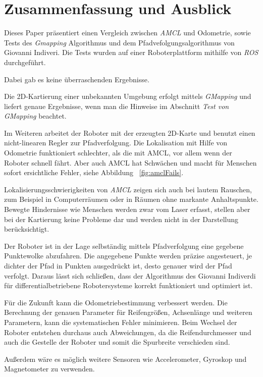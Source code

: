 \documentclass[11pt,a4paper]{article}
\begin{document}
{\section{Zusammenfassung und Ausblick}

Dieses Paper pr\"asentiert einen Vergleich zwischen \textit{AMCL} und Odometrie, sowie Tests des \textit{Gmapping} Algorithmus und dem Pfadvefolgungsalgorithmus von Giovanni Indiveri. Die Tests wurden auf einer Roboterplattform mithilfe von \textit{ROS} durchgef\"uhrt. 


Dabei gab es keine \"uberraschenden Ergebnisse.

Die 2D-Kartierung einer unbekannten Umgebung erfolgt mittels \textit{GMapping} und liefert genaue Ergebnisse, wenn man die Hinweise im Abschnitt  \textit{Test von GMapping}  beachtet.


Im Weiteren arbeitet der Roboter mit der erzeugten 2D-Karte und benutzt einen nicht-linearen Regler zur Pfadverfolgung.
Die Lokalisation mit Hilfe von Odometrie funktioniert schlechter, als die mit AMCL, vor allem wenn der Roboter schnell f\"ahrt. Aber auch AMCL hat Schw\"achen und macht f\"ur Menschen sofort ersichtliche Fehler, siehe Abbildung  ~\ref{fig:amclFails}.

Lokalisierungsschwierigkeiten von \textit{AMCL} zeigen sich auch bei lautem Rauschen, zum Beispiel in Computerr\"aumen oder in R\"aumen ohne markante Anhaltspunkte. Bewegte Hindernisse wie Menschen werden zwar vom Laser erfasst, stellen aber bei der Kartierung keine Probleme dar und werden nicht in der Darstellung ber\"ucksichtigt. 

Der Roboter ist in der Lage selbst\"andig mittels Pfadverfolgung eine gegebene Punktewolke abzufahren. Die angegebene Punkte werden pr\"azise angesteuert, je dichter der Pfad in Punkten ausgedr\"uckt ist, desto genauer wird der Pfad verfolgt. Daraus l\"asst sich schlie{\ss}en, dass der Algorithmus des Giovanni Indiverdi f\"ur differentialbetriebene Robotersysteme korrekt funktioniert und optimiert ist.

F\"ur die Zukunft kann die Odometriebestimmung verbessert werden. Die Berechnung der genauen Parameter f\"ur Reifengr\"o{\ss}en, Achsenl\"ange und weiteren Parametern, kann die systematischen Fehler minimieren. 
Beim Wechsel der Roboter entstehen durchaus auch Abweichungen, da die Reifendurchmesser und auch die Gestelle der Roboter und somit die Spurbreite verschieden sind.

Außerdem wäre es m\"oglich weitere Sensoren wie Accelerometer, Gyroskop und Magnetometer zu verwenden. 

}
\end{document}
